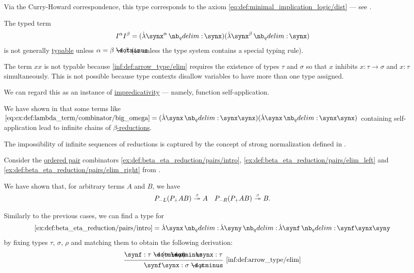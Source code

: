 \begin{example}
\begin{thmenum}
    Via the Curry-Howard correspondence, this type corresponds to the axiom \eqref{eq:def:minimal_implication_logic/dist} --- see .

     The typed term
    \begin{equation*}
      I^\alpha I^\beta = (\qabs {\synx^\alpha} \synx) (\qabs {\synx^\beta} \synx)
    \end{equation*}
    is not generally \hyperref[def:typability]{typable} unless \( \alpha = \beta \synimplies \beta \) (or unless the type system contains a special typing rule).

     The term \( xx \) is not typable because \ref{inf:def:arrow_type/elim} requires the existence of types \( \tau \) and \( \sigma \) so that \( x \) inhibits \( x: \tau \to \sigma \) and \( x: \tau \) simultaneously. This is not possible because type contexts disallow variables to have more than one type assigned.

    We can regard this as an instance of \hyperref[con:impredicativity]{impredicativity} --- namely, function self-application.

    We have shown in  that some terms like \( \ref{eq:ex:def:lambda_term/combinator/big_omega} = (\qabs \synx \synx \synx) (\qabs \synx \synx \synx) \) containing self-application lead to infinite chains of \hyperref[def:beta_eta_reduction]{\( \beta \)-reductions}.

    The impossibility of infinite sequences of reductions is captured by the concept of strong normalization defined in .

     Consider the \hyperref[def:ordered_tuple]{ordered pair} combinators \ref{ex:def:beta_eta_reduction/pairs/intro}, \ref{ex:def:beta_eta_reduction/pairs/elim_left} and \ref{ex:def:beta_eta_reduction/pairs/elim_right} from .

    We have shown that, for arbitrary terms \( A \) and \( B \), we have
    \begin{align*}
      P_{-L} (P_+ A B) \bred* A
      &&
      P_{-R} (P_+ A B) \bred* B.
    \end{align*}

    Similarly to the previous cases, we can find a type for
    \begin{equation*}
      \ref{ex:def:beta_eta_reduction/pairs/intro} = \qabs \synx \qabs \syny \qabs \synf \synf \synx \syny
    \end{equation*}
    by fixing types \( \tau \), \( \sigma \), \( \rho \) and matching them to obtain the following derivation:
    \begin{equation*}
      \begin{prooftree}
        \hypo{ \synf: \tau \synimplies (\sigma \synimplies \rho) }
        \hypo{ \synx: \tau }
        \infer2[\ref{inf:def:arrow_type/elim}]{ \synf \synx: \sigma \synimplies \rho }


\end{prooftree}
\end{equation*}
\end{thmenum}
\end{example}
